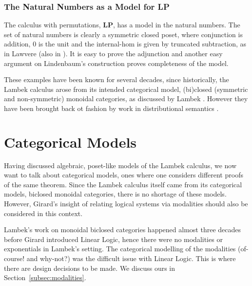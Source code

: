 \documentclass{llncs}
\begin{document}
\subsubsection{The Natural Numbers as a Model for LP}
\label{subsec:the_set_of_natural_numbers}
The calculus with permutations, $\textbf{LP}$, has a model in the natural numbers.
The set of natural numbers is
clearly a symmetric closed poset, where conjunction is addition, $0$ is the unit and the
internal-hom is given by truncated subtraction, as in Lawvere \cite{lawvere1973} (also in  \cite{depaiva1991, Hyland:1991}).  It is easy
to prove the adjunction and another easy argument on Lindenbaum's construction  proves completeness of the model.

These examples have been known for several decades, since historically, the Lambek calculus arose from its intended categorical model, (bi)closed (symmetric and non-symmetric) monoidal categories, as discussed by Lambek \cite{lambek1988}. However they have been brought back ot fashion by work in distributional semantics \cite{coecke2013}.


\section{Categorical Models}

Having discussed algebraic, poset-like models of the Lambek calculus,
we now want to talk about categorical models, ones where one considers
different proofs of the same theorem. Since the Lambek calculus itself
came from its categorical models, biclosed monoidal categories, there
is no shortage of these models. However, Girard's insight of relating
logical systems via modalities should also be considered in this
context.

Lambek's work on monoidal biclosed categories happened almost three
decades before Girard introduced Linear Logic, hence there were no
modalities or exponentials in Lambek's setting. The categorical
modelling of the modalities (of-course! and why-not?) was the
difficult issue with Linear Logic.
This is where there are design decisions to be made. We discuss ours
in Section~\ref{subsec:modalities}.
\end{document}
